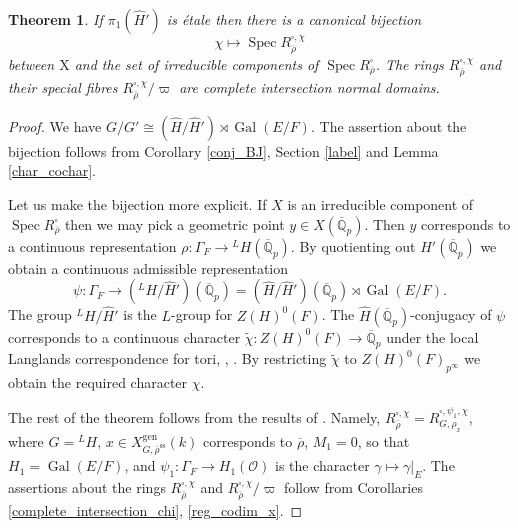 \documentclass{amsart}
\newtheorem{thm}[prop]{Theorem}
\theoremstyle{definition}
\theoremstyle{remark}
\DeclareMathOperator{\Gal}{Gal}
\DeclareMathOperator{\Spec}{Spec}
\newcommand{\Qpbar}{\overline{\mathbb{Q}}_p}
\newcommand{\OO}{\mathcal O}
\newcommand{\rhobar}{\overline{\rho}}
\newcommand{\gen}{\mathrm{gen}}
\newcommand{\rhobarss}{\rhobar^{\mathrm{ss}}}
\begin{document}
\begin{thm}\label{L2} If $\pi_1(\widehat{H}')$ is \'etale then there is a canonical bijection 
$$ \chi\mapsto \Spec R^{\square, \chi}_{\rhobar}$$
between $\mathrm X$ and the set of irreducible components of $\Spec R^{\square}_{\rhobar}$. The rings $R^{\square, \chi}_{\rhobar}$ and
their special fibres $R^{\square, \chi}_{\rhobar}/\varpi$ are complete intersection normal domains.
\end{thm}
\begin{proof} We have 
$ G/G'\cong (\widehat{H}/\widehat{H}')\rtimes \Gal(E/F).$
The assertion about the bijection follows from 
Corollary \ref{conj_BJ}, Section \ref{label} and Lemma \ref{char_cochar}. 

Let us make the bijection more explicit. If $X$ is an irreducible 
component of $\Spec R^{\square}_{\rhobar}$ then we may pick 
a geometric point $y\in X(\Qpbar)$. Then $y$ corresponds 
to a continuous representation $\rho: \Gamma_F \rightarrow {}^L H(\Qpbar)$. 
By quotienting out $\widehat{H}'(\Qpbar)$  we obtain a continuous 
admissible representation 
$$\psi: \Gamma_F \rightarrow ({}^L H/\widehat{H}')(\Qpbar)=(\widehat{H}/\widehat{H}')(\Qpbar)\rtimes \Gal(E/F).$$
The group ${}^LH/\widehat{H}'$ is the $L$-group for $Z(H)^0(F)$. 
The  $\widehat{H}(\Qpbar)$-conjugacy of $\psi$ corresponds to a continuous character $\tilde{\chi}: Z(H)^0(F)\rightarrow \Qpbar$ under the local Langlands
correspondence for tori, \cite{langlands_tori}, \cite{birkbeck}.  By restricting 
$\tilde{\chi}$ to $Z(H)^0(F)_{p^{\infty}}$ we obtain the required character $\chi$. 

The rest of the theorem follows from the results of . 
Namely, $R^{\square,\chi}_{\rhobar}= R^{\square, \psi_1, \chi}_{G, \rho_x}$, 
where $G={}^L H$, $x\in X^{\gen}_{G, \rhobarss}(k)$ corresponds to $\rhobar$, $M_1=0$, so that $H_1= \Gal(E/F)$, and $\psi_1:\Gamma_F \rightarrow H_1(\OO)$
is the character $\gamma\mapsto \gamma|_E$. The assertions about the rings 
$R^{\square,\chi}_{\rhobar}$ and 
$R^{\square,\chi}_{\rhobar}/\varpi$ follow from Corollaries 
\ref{complete_intersection_chi}, \ref{reg_codim_x}.
\end{proof}
\end{document}

